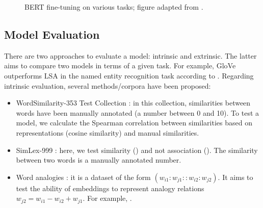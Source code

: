 \documentclass{KBook}
\begin{document}
\begin{figure}[ht]
	\centering
	
	\caption[BERT fine-tuning on various tasks.]{BERT fine-tuning on various tasks; figure adapted from \cite{2019-devlin-al}.}
	\label{fig:bert-app}
\end{figure}


%	
%	


\subsection{Model Evaluation}

There are two approaches to evaluate a model: intrinsic and extrinsic. 
The latter aims to compare two models in terms of a given task. 
For example, GloVe outperforms LSA in the named entity recognition task according to \citet{2014-pennington-al}. 
Regarding intrinsic evaluation, several methods/corpora have been proposed:
\begin{itemize}
	\item WordSimilarity-353 Test Collection \cite{2002-finkelstein-al}: in this collection, similarities between words have been manually annotated (a number between 0 and 10). To test a model, we calculate the Spearman correlation between similarities based on representations (cosine similarity) and manual similarities.
	
	\item SimLex-999 \cite{2015-hill-al}: here, we test similarity () and not association (). The similarity between two words is a manually annotated number.
	
	\item Word analogies \cite{2013-mikolov-al2}: it is a dataset of the form $(w_{i1}:w_{j1} :: w_{i2}:w_{j2})$. It aims to test the ability of embeddings to represent analogy relations $w_{j2} = w_{i1} - w_{i2} + w_{j1}$. For example, .
\end{itemize}
\end{document}
